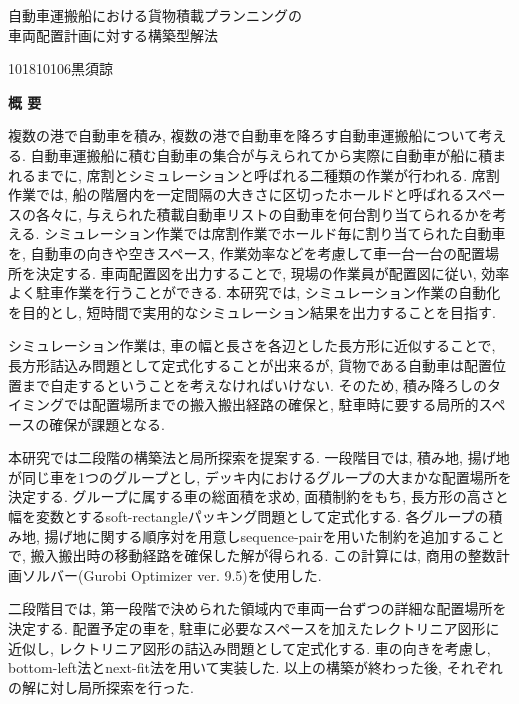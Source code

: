 \begin{center}
\begin{spacing}{1.3}
    {\LARGE 自動車運搬船における貨物積載プランニングの\\車両配置計画に対する構築型解法}\\[0.5cm]
\end{spacing}
\end{center}
\hfill
{\large 101810106\qquad 黒須諒}\\[0.5cm]
\begin{center}
{\Large \bf 概 要}\\
\end{center}

複数の港で自動車を積み, 複数の港で自動車を降ろす自動車運搬船について考える. 
自動車運搬船に積む自動車の集合が与えられてから実際に自動車が船に積まれるまでに, 席割とシミュレーションと呼ばれる二種類の作業が行われる. 
席割作業では, 船の階層内を一定間隔の大きさに区切ったホールドと呼ばれるスペースの各々に, 与えられた積載自動車リストの自動車を何台割り当てられるかを考える. 
シミュレーション作業では席割作業でホールド毎に割り当てられた自動車を, 自動車の向きや空きスペース, 作業効率などを考慮して車一台一台の配置場所を決定する. 
車両配置図を出力することで, 現場の作業員が配置図に従い, 効率よく駐車作業を行うことができる. 
本研究では, シミュレーション作業の自動化を目的とし, 短時間で実用的なシミュレーション結果を出力することを目指す. 

シミュレーション作業は, 車の幅と長さを各辺とした長方形に近似することで, 長方形詰込み問題として定式化することが出来るが, 貨物である自動車は配置位置まで自走するということを考えなければいけない. 
そのため, 積み降ろしのタイミングでは配置場所までの搬入搬出経路の確保と, 駐車時に要する局所的スペースの確保が課題となる. 

本研究では二段階の構築法と局所探索を提案する. 
一段階目では, 積み地, 揚げ地が同じ車を1つのグループとし, デッキ内におけるグループの大まかな配置場所を決定する. 
グループに属する車の総面積を求め, 面積制約をもち, 長方形の高さと幅を変数とするsoft-rectangleパッキング問題として定式化する. 
各グループの積み地, 揚げ地に関する順序対を用意しsequence-pairを用いた制約を追加することで, 搬入搬出時の移動経路を確保した解が得られる. 
この計算には, 商用の整数計画ソルバー(Gurobi Optimizer ver. 9.5)を使用した.  

二段階目では, 第一段階で決められた領域内で車両一台ずつの詳細な配置場所を決定する. 
配置予定の車を, 駐車に必要なスペースを加えたレクトリニア図形に近似し, レクトリニア図形の詰込み問題として定式化する. 
車の向きを考慮し, bottom-left法とnext-fit法を用いて実装した. 
以上の構築が終わった後, それぞれの解に対し局所探索を行った.  

